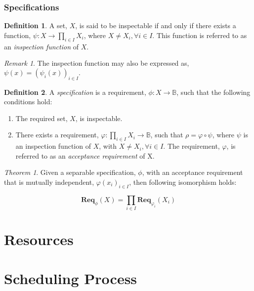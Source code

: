 \documentclass{article}
\theoremstyle{definition}
\newtheorem{definition}{Definition}[section]
\theoremstyle{remark}
\newtheorem*{remark}{Remark}
\newtheorem*{theorem}{Theorem}
\newcommand{\func}[3]{#1:#2\rightarrow#3}
\newcommand{\reqfunc}[2]{#1:#2\rightarrow\mathbb{B}}
\newcommand{\reqop}[2]{\mathbf{Req}_{#1}(#2)}
\begin{document}
	\section{Specifications}
	
		\begin{definition}
			A set, $X$, is said to be inspectable if and only if there exists a function, $\func{\psi}{X}{\prod_{i \in I}{X_{i}}}$, where $X \ne X_{i}, \forall i \in I$. This function is referred to as an \emph{inspection function} of $X$.
		\end{definition}
		
		\begin{remark}
			The inspection function may also be expressed as, $\psi(x) = (\psi_{i}(x))_{i \in I}.$
		\end{remark}
		
		\begin{definition}
			A \emph{specification} is a requirement, $\reqfunc{\phi}{X}$, such that the following conditions
			hold:
			
			\begin{enumerate}
				\item   The required set, $X$, is inspectable.
				
				\item   There exists a requirement, $\reqfunc{\varphi}{\prod_{i \in I}{X_{i}}}$,
				such that $\rho = \varphi \circ \psi$, where $\psi$ is an inspection function of $X$,
				with $X \ne X_{i}, \forall i \in I$. The requirement, $\varphi$, is referred to as an
				\emph{acceptance requirement} of X.
			\end{enumerate}
			
		\end{definition}
		
		\begin{theorem}
			Given a separable specification, $\phi$, with an acceptance requirement that is mutually independent,
			$\varphi(x_i)_{i \in I}$, then following isomorphism holds:
			
			\[
			\reqop{\phi}{X} = \prod_{i \in I}\reqop{\varphi_{i}}{X_{i}}
			\]
		\end{theorem}
	
	\newpage
	
	\part{Resources}
	
	\newpage
	
	\part{Scheduling Process}
	
\end{document}
